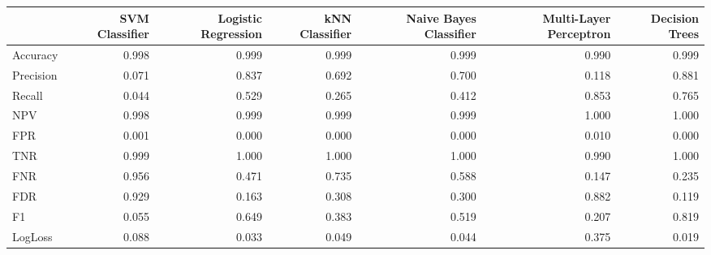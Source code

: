 \begin{tabular}{lrrrrrr}
\toprule
{} &  SVM Classifier &  Logistic Regression &  kNN Classifier &  Naive Bayes Classifier &  Multi-Layer Perceptron &  Decision Trees \\
\midrule
Accuracy  &           0.998 &                0.999 &           0.999 &                   0.999 &                   0.990 &           0.999 \\
Precision &           0.071 &                0.837 &           0.692 &                   0.700 &                   0.118 &           0.881 \\
Recall    &           0.044 &                0.529 &           0.265 &                   0.412 &                   0.853 &           0.765 \\
NPV       &           0.998 &                0.999 &           0.999 &                   0.999 &                   1.000 &           1.000 \\
FPR       &           0.001 &                0.000 &           0.000 &                   0.000 &                   0.010 &           0.000 \\
TNR       &           0.999 &                1.000 &           1.000 &                   1.000 &                   0.990 &           1.000 \\
FNR       &           0.956 &                0.471 &           0.735 &                   0.588 &                   0.147 &           0.235 \\
FDR       &           0.929 &                0.163 &           0.308 &                   0.300 &                   0.882 &           0.119 \\
F1        &           0.055 &                0.649 &           0.383 &                   0.519 &                   0.207 &           0.819 \\
LogLoss   &           0.088 &                0.033 &           0.049 &                   0.044 &                   0.375 &           0.019 \\
\bottomrule
\end{tabular}
